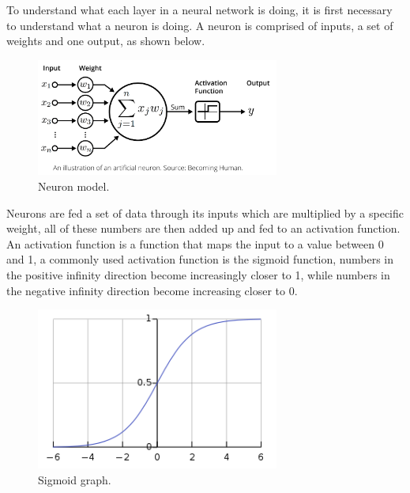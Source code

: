 \documentclass[a4paper,twoside,phd]{BYUPhys}
\begin{document}
To understand what each layer in a neural network is doing, it is first necessary to understand what a neuron is doing. A neuron is comprised of inputs, a set of weights and one output, as shown below.
\begin{figure}[H]
\centering
\includegraphics[width=8cm]{pictures/neuron_model.png}
\caption{Neuron model.}
\label{fig:neuron_model}
\end{figure}

Neurons are fed a set of data through its inputs which are multiplied by a specific weight, all of these numbers are then added up and fed to an activation function. An activation function is a function that maps the input to a value between 0 and 1, a commonly used activation function is the sigmoid function, numbers in the positive infinity direction become increasingly closer to 1, while numbers in the negative infinity direction become increasing closer to 0.
\begin{figure}[H]
\centering
\includegraphics[width=8cm]{pictures/sigmoid.png}
\caption{Sigmoid graph.}
\label{fig:sigmoid}
\end{figure}
\end{document}
